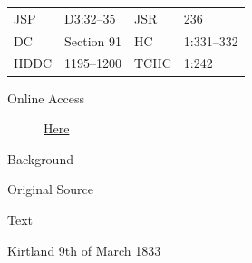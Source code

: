 				\begin{tabular}{p{0.5in}p{1in}p{0.5in}p{1in}}
				JSP	 	& D3:32--35			& JSR 		& 236 \\
				DC	 	& Section 91 		& HC 		& 1:331--332 \\
				HDDC 	& 1195--1200		& TCHC 		& 1:242 \\
				\end{tabular}
			
			\begin{description}
				\item[Online Access] \href{https://www.josephsmithpapers.org/paper-summary/revelation-9-march-1833-dc-91/1}{Here}
			\end{description}
			
			\begin{description}
				\item[Background]
			\end{description}
			
			
			\begin{description}
				\item[Original Source]
			\end{description}
			
			
			\begin{description}
				\item[Text]
			\end{description}
			
				\begin{tightcenter}
				Kirtland 9th of March 1833
				\end{tightcenter}
				
